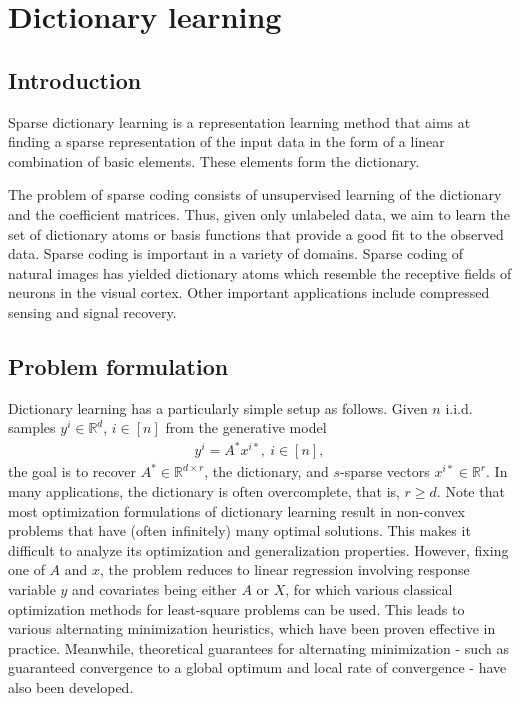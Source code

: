 
\section{Dictionary learning}
\subsection{Introduction}
Sparse dictionary learning is a representation learning method that aims at finding a sparse representation of the input data in the form of a linear combination of basic elements. These elements form the dictionary. 

The problem of sparse coding consists of unsupervised learning of the dictionary and the coefficient matrices. Thus, given only unlabeled data, we aim to learn the set of dictionary atoms or
basis functions that provide a good fit to the observed data. Sparse coding is important in a variety of domains. Sparse coding of natural images has yielded dictionary atoms which resemble the receptive fields of neurons in the visual cortex. Other important applications include compressed sensing and signal recovery.

\subsection{Problem formulation}
Dictionary learning has a particularly simple setup as follows. Given $n$ i.i.d. samples $y^i\in \mathbb{R}^d$, $i\in [n]$ from the generative model
\begin{align}
    y^i = A^* x^{i*}, \ i\in [n], \label{eq:gen-model}
\end{align}
the goal is to recover $A^*\in \mathbb{R}^{d\times r}$, the dictionary, and $s$-sparse vectors $x^{i*}\in \mathbb{R}^r$.  In many applications, the dictionary is often overcomplete, that is, $r \geq d$. Note that most optimization formulations of dictionary learning result in non-convex problems that have (often infinitely) many optimal solutions. This makes it difficult to analyze its optimization and generalization properties. 
However, fixing one of $A$ and $x$, the problem reduces to linear regression involving response variable $y$ and covariates being either $A$ or $X$, for which various classical optimization methods for least-square problems can be used. This leads to various alternating minimization heuristics, which have been proven effective in practice. Meanwhile, theoretical guarantees for alternating minimization - such as guaranteed convergence to a global optimum and local rate of convergence - have also been developed.



